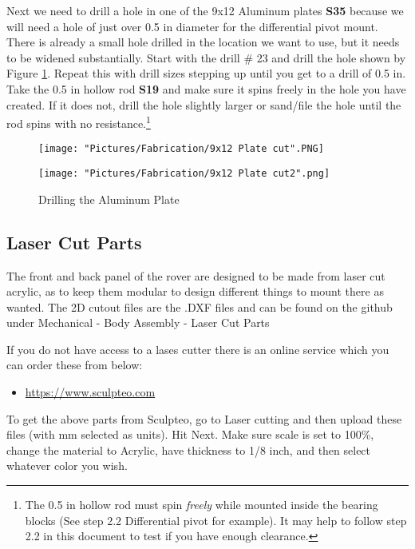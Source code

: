\documentclass{article}
\begin{document}
Next we need to drill a hole in one of the 9x12 Aluminum plates \textbf{S35} because we will need a hole of just over 0.5 in diameter for the differential pivot mount. There is already a small hole drilled in the location we want to use, but it needs to be widened substantially. Start with the drill \# 23 and drill the hole shown by Figure \ref{Drilling the Al plate}. Repeat this with drill sizes stepping up until you get to a drill of 0.5 in. Take the 0.5 in hollow rod \textbf{S19} and make sure it spins freely in the hole you have created. If it does not, drill the hole slightly larger or sand/file the hole until the rod spins with no resistance.\footnote{The 0.5 in hollow rod must spin \textit{freely} while mounted inside the bearing blocks (See step 2.2 Differential pivot for example). It may help to follow step 2.2 in this document to test if you have enough clearance.}

\begin{figure}[H]
  \centering
  \begin{minipage}[b]{0.45\textwidth}
    \texttt{[image: "Pictures/Fabrication/9x12 Plate cut".PNG]}
  \end{minipage}
  \hfill
  \begin{minipage}[b]{0.45\textwidth}
    \texttt{[image: "Pictures/Fabrication/9x12 Plate cut2".png]}
  \end{minipage}
  \caption{Drilling the Aluminum Plate}
  \label{Drilling the Al plate}
\end{figure}

\newpage
\subsection{Laser Cut Parts}

The front and back panel of the rover are designed to be made from laser cut acrylic, as to keep them modular to design different things to mount there as wanted. The 2D cutout files  are the .DXF files  and can be found on the github under Mechanical - Body Assembly - Laser Cut Parts

 \noindent If you do not have access to a lases cutter there is an online service which you can order these from below:

\begin{itemize}
	\item \href{https://www.sculpteo.com}{https://www.sculpteo.com}
\end{itemize}

To get the above parts from Sculpteo, go to Laser cutting and then upload these files (with mm selected as units). Hit Next. Make sure scale is set to 100\%, change the material to Acrylic, have thickness to 1/8 inch, and then select whatever color you wish.
\end{document}
